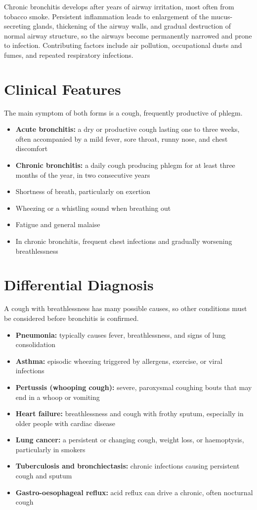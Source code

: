 Chronic bronchitis develops after years of airway irritation, most often from tobacco smoke. Persistent inflammation leads to enlargement of the mucus-secreting glands, thickening of the airway walls, and gradual destruction of normal airway structure, so the airways become permanently narrowed and prone to infection. Contributing factors include air pollution, occupational dusts and fumes, and repeated respiratory infections.

\section*{Clinical Features}
The main symptom of both forms is a cough, frequently productive of phlegm.

\begin{itemize}
    \item \textbf{Acute bronchitis:} a dry or productive cough lasting one to three weeks, often accompanied by a mild fever, sore throat, runny nose, and chest discomfort
    \item \textbf{Chronic bronchitis:} a daily cough producing phlegm for at least three months of the year, in two consecutive years
    \item Shortness of breath, particularly on exertion
    \item Wheezing or a whistling sound when breathing out
    \item Fatigue and general malaise
    \item In chronic bronchitis, frequent chest infections and gradually worsening breathlessness
\end{itemize}

\section*{Differential Diagnosis}
A cough with breathlessness has many possible causes, so other conditions must be considered before bronchitis is confirmed.

\begin{itemize}
    \item \textbf{Pneumonia:} typically causes fever, breathlessness, and signs of lung consolidation
    \item \textbf{Asthma:} episodic wheezing triggered by allergens, exercise, or viral infections
    \item \textbf{Pertussis (whooping cough):} severe, paroxysmal coughing bouts that may end in a whoop or vomiting
    \item \textbf{Heart failure:} breathlessness and cough with frothy sputum, especially in older people with cardiac disease
    \item \textbf{Lung cancer:} a persistent or changing cough, weight loss, or haemoptysis, particularly in smokers
    \item \textbf{Tuberculosis and bronchiectasis:} chronic infections causing persistent cough and sputum
    \item \textbf{Gastro-oesophageal reflux:} acid reflux can drive a chronic, often nocturnal cough
\end{itemize}

